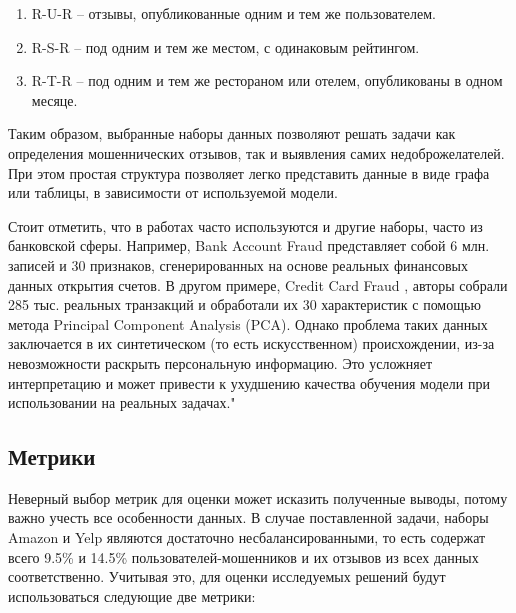 \begin{enumerate}
    \item R-U-R -- отзывы, опубликованные одним и тем же пользователем.

    \item R-S-R -- под одним и тем же местом, с одинаковым рейтингом.

    \item R-T-R -- под одним и тем же рестораном или отелем, опубликованы в одном месяце.
\end{enumerate}

Таким образом, выбранные наборы данных позволяют решать задачи как определения мошеннических отзывов, так и выявления самих недоброжелателей. При этом простая структура позволяет легко представить данные в виде графа или таблицы, в зависимости от используемой модели.

Стоит отметить, что в работах часто используются и другие наборы, часто из банковской сферы. Например, Bank Account Fraud \cite{jesus2022} представляет собой 6 млн. записей и 30 признаков, сгенерированных на основе реальных финансовых данных открытия счетов. В другом примере, Credit Card Fraud \cite{pozzolo2015}, авторы собрали 285 тыс. реальных транзакций и обработали их 30 характеристик с помощью метода Principal Component Analysis (PCA).  Однако проблема таких данных заключается в их синтетическом (то есть искусственном) происхождении, из-за невозможности раскрыть персональную информацию. Это усложняет интерпретацию и может привести к ухудшению качества обучения модели при использовании на реальных задачах."

\pagebreak



\subsection{Метрики}

Неверный выбор метрик для оценки может исказить полученные выводы, потому важно учесть все особенности данных. В случае поставленной задачи, наборы Amazon и Yelp являются достаточно несбалансированными, то есть содержат всего 9.5\% и 14.5\% пользователей-мошенников и их отзывов из всех данных соответственно. Учитывая это, для  оценки исследуемых решений будут использоваться следующие две метрики:

